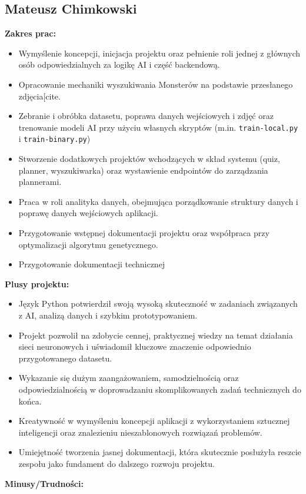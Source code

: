 \documentclass[12pt,a4paper]{article}
\begin{document}
\newpage

\subsection{Mateusz Chimkowski}
\textbf{Zakres prac:}
\begin{itemize}
    \item Wymyślenie koncepcji, inicjacja projektu oraz pełnienie roli jednej z głównych osób odpowiedzialnych za logikę AI i część backendową.
    \item Opracowanie mechaniki wyszukiwania Monsterów na podstawie przesłanego zdjęcia[cite.
    \item Zebranie i obróbka datasetu, poprawa danych wejściowych i zdjęć oraz trenowanie modeli AI przy użyciu własnych skryptów (m.in. \texttt{train-local.py} i \texttt{train-binary.py})
    \item Stworzenie dodatkowych projektów wchodzących w skład systemu (quiz, planner, wyszukiwarka) oraz wystawienie endpointów do zarządzania plannerami.
    \item Praca w roli analityka danych, obejmująca porządkowanie struktury danych i poprawę danych wejściowych aplikacji.
    \item Przygotowanie wstępnej dokumentacji projektu oraz współpraca przy optymalizacji algorytmu genetycznego.
    \item Przygotowanie dokumentacji technicznej
\end{itemize}
\textbf{Plusy projektu:} 
\begin{itemize}
    \item Język Python potwierdził swoją wysoką skuteczność w zadaniach związanych z AI, analizą danych i szybkim prototypowaniem.
    \item Projekt pozwolił na zdobycie cennej, praktycznej wiedzy na temat działania sieci neuronowych i uświadomił kluczowe znaczenie odpowiednio przygotowanego datasetu.
    \item Wykazanie się dużym zaangażowaniem, samodzielnością oraz odpowiedzialnością w doprowadzaniu skomplikowanych zadań technicznych do końca.
    \item Kreatywność w wymyśleniu koncepcji aplikacji z wykorzystaniem sztucznej inteligencji oraz znalezieniu nieszablonowych rozwiązań problemów.
    \item Umiejętność tworzenia jasnej dokumentacji, która skutecznie posłużyła reszcie zespołu jako fundament do dalszego rozwoju projektu.
\end{itemize}
\textbf{Minusy/Trudności:}
\end{document}
